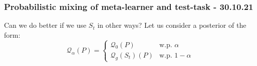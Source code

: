 \documentclass[letterpaper]{article}
\theoremstyle{definition}
\begin{document}








%
%
%
%

\subsubsection{Probabilistic mixing of meta-learner and test-task - 30.10.21}

Can we do better if we use $S_t$ in other ways? 
Let us consider a posterior of the form:
$$ \mathcal{Q}_\alpha(P) = \begin{cases}
\mathcal{Q}_0(P) & \text{w.p. } \alpha\\
\mathcal{Q}_{g}(S_t)(P)  &\text{w.p. } 1-\alpha
\end{cases} $$
\end{document}
